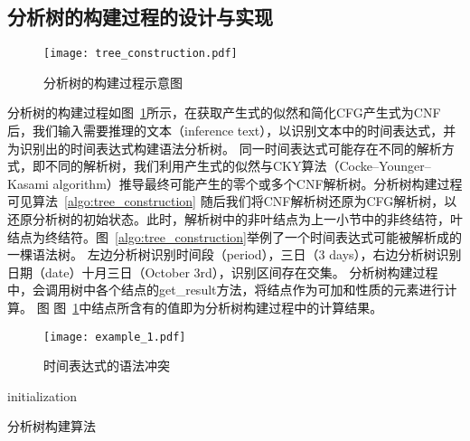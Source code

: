 \subsection{分析树的构建过程的设计与实现}

\begin{figure}[h]
    \centering
    \texttt{[image: tree\_construction.pdf]}
    \caption{分析树的构建过程示意图}
    \label{fig:tree_construction}
\end{figure}

分析树的构建过程如图~\ref{fig:tree_construction}所示，在获取产生式的似然和简化CFG产生式为CNF后，我们输入需要推理的文本（inference text），以识别文本中的时间表达式，并为识别出的时间表达式构建语法分析树。
同一时间表达式可能存在不同的解析方式，即不同的解析树，我们利用产生式的似然与CKY算法（Cocke–Younger–Kasami algorithm）推导最终可能产生的零个或多个CNF解析树。分析树构建过程可见算法~\ref{algo:tree_construction}
随后我们将CNF解析树还原为CFG解析树，以还原分析树的初始状态。此时，解析树中的非叶结点为上一小节中的非终结符，叶结点为终结符。图~\ref{algo:tree_construction}举例了一个时间表达式可能被解析成的一棵语法树。
左边分析树识别时间段（period），三日（3 days），右边分析树识别日期（date）十月三日（October 3rd），识别区间存在交集。 分析树构建过程中，会调用树中各个结点的get\_result方法，将结点作为可加和性质的元素进行计算。 图
图~\ref{fig:tree_construction}中结点所含有的值即为分析树构建过程中的计算结果。


\begin{figure}[h]
    \centering
    \texttt{[image: example\_1.pdf]}
    \caption{时间表达式的语法冲突}
    \label{fig:example_1}
\end{figure}

\begin{algorithm}[h]
    \SetAlgoLined
    initialization\;
     {
    }
    \caption{分析树构建算法}
    \label{algo:tree_construction}
\end{algorithm}


